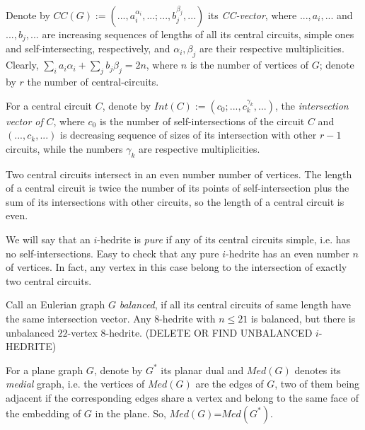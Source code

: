 \documentclass[12pt]{article}
\begin{document}


Denote by 
$CC(G):=(...,a_i^{\alpha_i},...;...,b_j^{\beta_j},...)$ its {\it CC-vector}, 
where $...,a_i,...$ and  $...,b_j,...$ are increasing sequences of lengths of 
all its central circuits, simple ones and self-intersecting, respectively, 
and $\alpha_i, \beta_j$ are their respective multiplicities.
Clearly, $\sum_{i} a_i{\alpha_i}+ \sum_{j} b_j{\beta_j}=2n$, where 
$n$ is the number of vertices of $G$; denote by $r$ the number of 
central-circuits.


For a central circuit $C$, denote by $Int(C):=(c_0;...,c_k^{\gamma_k},...)$,
the {\em intersection vector of} $C$, where $c_0$ is
the number of self-intersections of the circuit $C$ and $(...,c_k,...)$ is
decreasing sequence of sizes of its intersection with other $r-1$ 
circuits, while the numbers $\gamma_k$ are respective multiplicities.


Two central circuits intersect in an even number number of vertices. 
The length of a central circuit is twice the number of its points of 
self-intersection plus the sum of its intersections with other circuits, 
so the length of a central circuit is even.



We will say that an $i$-hedrite is {\it pure} if any of its central circuits 
simple, i.e. has no self-intersections.
Easy to check that any pure $i$-hedrite has an even number $n$ of 
vertices. In fact, any vertex in this case belong to the intersection 
of exactly two central circuits.


Call an Eulerian graph $G$ {\it balanced}, if all its central circuits of
same length have the same intersection vector.
Any $8$-hedrite with $n \le 21$ is balanced, but there is unbalanced $22$-vertex $8$-hedrite. (DELETE OR FIND UNBALANCED $i$-HEDRITE)







For a plane graph $G$, denote by $G^*$ its planar dual and {\em $Med(G)$} 
denotes its {\em medial} graph, i.e. the vertices of $Med(G)$ are the edges of 
$G$, two of them being adjacent if the corresponding edges share a vertex and 
belong to the same face of the embedding of $G$ in the plane. 
So, $Med(G)$=$Med(G^*)$.
\end{document}
